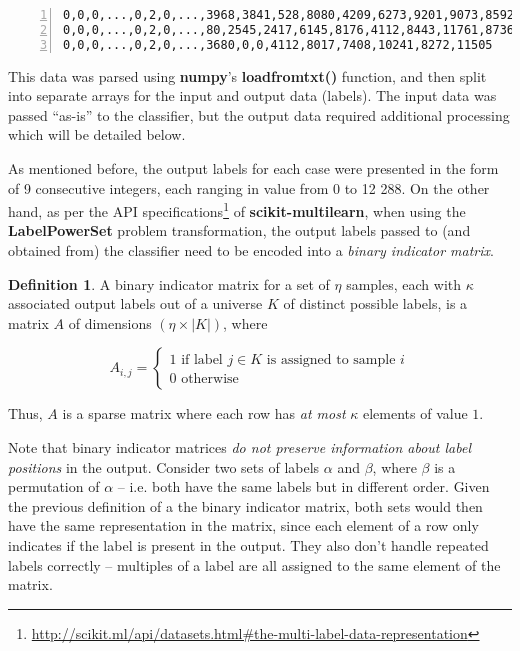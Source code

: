 \documentclass{kthreport}
\theoremstyle{definition}
\newtheorem{definition}{Definition}
\begin{document}
\begin{lstlisting}[captionpos=b,
				basicstyle={\small\ttfamily},
				numbers=left, 
				numberstyle=\tiny\color{gray},
				caption={Abbreviated example of input samples.}]
0,0,0,...,0,2,0,...,3968,3841,528,8080,4209,6273,9201,9073,8592
0,0,0,...,0,2,0,...,80,2545,2417,6145,8176,4112,8443,11761,8736
0,0,0,...,0,2,0,...,3680,0,0,4112,8017,7408,10241,8272,11505
\end{lstlisting}

This data was parsed using \textbf{numpy}'s \textbf{loadfromtxt()} function, and then split into separate arrays for the input and output data (labels). The input data was passed ``as-is'' to the classifier, but the output data required additional processing which will be detailed below.


As mentioned before, the output labels for each case were presented in the form of 9 consecutive integers, each ranging in value from 0 to 12 288. On the other hand, as per the API specifications\footnote{\url{http://scikit.ml/api/datasets.html#the-multi-label-data-representation}} of \textbf{scikit-multilearn}, when using the \textbf{LabelPowerSet} problem transformation, the output labels passed to (and obtained from) the classifier need to be encoded into a \emph{binary indicator matrix}. 

\begin{definition}
	A binary indicator matrix for a set of $\eta$ samples, each with $\kappa$ associated output labels out of a universe $K$ of distinct possible labels, is a matrix $A$ of dimensions $(\eta \times |K|)$, where
	
	\[ A_{i,j} = \begin{cases}
	1 \text{ if label } j \in K \text{ is assigned to sample } i \\
	0 \text{ otherwise }
	\end{cases} \]
	
	Thus, $A$ is a sparse matrix where each row has \emph{at most} $\kappa$ elements of value $1$.
\end{definition}

Note that binary indicator matrices \emph{do not preserve information about label positions} in the output.
Consider two sets of labels $\alpha$ and $\beta$, where $\beta$ is a permutation of $\alpha$ -- i.e. both have the same labels but in different order. 
Given the previous definition of a the binary indicator matrix, both sets would then have the same representation in the matrix, since each element of a row only indicates if the label is present in the output. 
They also don't handle repeated labels correctly -- multiples of a label are all assigned to the same element of the matrix.
\end{document}

